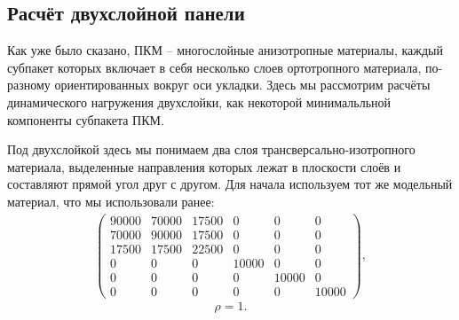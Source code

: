 \subsection{Расчёт двухслойной панели}

	Как уже было сказано, ПКМ -- многослойные анизотропные материалы, каждый субпакет которых включает в себя несколько слоев ортотропного материала, по-разному ориентированных вокруг оси укладки.
	Здесь мы рассмотрим расчёты динамического нагружения двухслойки, как некоторой минимальльной компоненты субпакета ПКМ.

	Под двухслойкой здесь мы понимаем два слоя трансверсально-изотропного материала, выделенные направления которых лежат в плоскости слоёв и составляют прямой угол друг с другом.
	Для начала используем тот же модельный материал, что мы использовали ранее:
\begin{align}
\label{model_mat}
\left( \begin{array}{cccccccccccc}
90000 & 70000 & 17500 & 0 & 0 & 0 \\ 
70000 & 90000 & 17500 & 0 & 0 & 0 \\ 
17500 & 17500 & 22500 & 0 & 0 & 0 \\ 
0 & 0 & 0 & 10000 & 0 & 0 \\ 
0 & 0 & 0 & 0 & 10000 & 0 \\ 
0 & 0 & 0 & 0 & 0 & 10000
\end{array} \right),
\end{align}	
\begin{equation}
	\rho = 1.
\end{equation}
	
